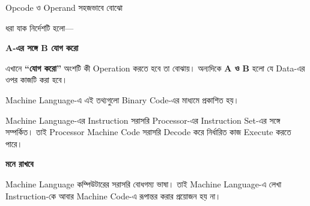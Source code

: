 \begin{examplebox}{Opcode ও Operand সহজভাবে বোঝো}

ধরা যাক নির্দেশটি হলো—

\begin{center}

\textbf{A-এর সঙ্গে B যোগ করো}

\end{center}

এখানে \textbf{``যোগ করো''} অংশটি কী Operation করতে হবে তা বোঝায়।
অন্যদিকে \textbf{A ও B} হলো যে Data-এর ওপর কাজটি করা হবে।

Machine Language-এ এই তথ্যগুলো Binary Code-এর মাধ্যমে প্রকাশিত হয়।

\end{examplebox}


Machine Language-এর Instruction সরাসরি Processor-এর
Instruction Set-এর সঙ্গে সম্পর্কিত। তাই Processor Machine Code
সরাসরি Decode করে নির্ধারিত কাজ Execute করতে পারে।

\begin{center}


\end{center}

\begin{rememberbox}

\textbf{\color{deepOrange}মনে রাখবে}

Machine Language কম্পিউটারের সরাসরি বোধগম্য ভাষা।
তাই Machine Language-এ লেখা Instruction-কে আবার Machine Code-এ
রূপান্তর করার প্রয়োজন হয় না।

\end{rememberbox}

